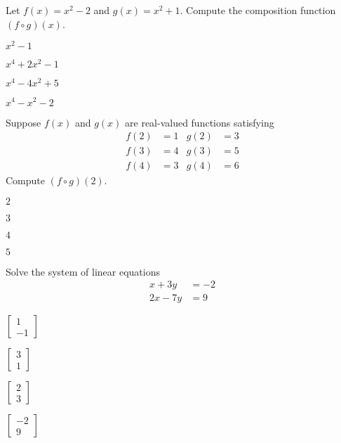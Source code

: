 \documentclass{article}
\begin{document}
\begin{readinessAssuranceTest}
\setcounter{enumi}{40}
\item Let $f(x) = x^2-2$ and $g(x)= x^2+1$.  Compute the composition function $(f \circ g)(x)$.
\begin{readinessAssuranceTestChoices}
\item $x^2-1$
\item $x^4+2x^2-1$
\item $x^4-4x^2+5$
\item $x^4-x^2-2$
\end{readinessAssuranceTestChoices}

\item Suppose $f(x)$ and $g(x)$ are real-valued functions satisfying
\begin{align*}
f(2) &= 1 & g(2) & = 3 \\
f(3) &= 4 & g(3) &= 5 \\
f(4) &= 3 & g(4) &= 6
\end{align*}
Compute $(f \circ g)(2)$.
\begin{readinessAssuranceTestChoices}
\item $2$
\item $3$
\item $4$
\item $5$
\end{readinessAssuranceTestChoices}


\item Solve the system of linear equations
\begin{align*}
x+3y &= -2 \\
2x-7y &= 9
\end{align*}

\begin{multicols}{4}
\begin{readinessAssuranceTestChoices}
\item $\begin{bmatrix} 1 \\ -1 \end{bmatrix}$
\item $\begin{bmatrix} 3 \\ 1 \end{bmatrix}$
\item $\begin{bmatrix} 2 \\ 3 \end{bmatrix}$
\item $\begin{bmatrix} -2 \\ 9 \end{bmatrix}$
\end{readinessAssuranceTestChoices}
\end{multicols}


\end{readinessAssuranceTest}
\end{document}

